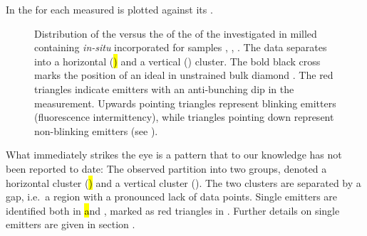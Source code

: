 	In  the \lw for each measured \ZPL is plotted against its \cwl.

	\begin{figure}[!htb]
			\centering
			\caption[Spectral distribution of \siv \ZPLs]{Distribution of the \ZPL \cwl versus the \lw of the \ZPL of the investigated \sivs in milled \nds containing \textit{in-situ} incorporated \sivs for samples \insituF, \insituS, \insituH{}. The data separates into a horizontal (\hl) and a vertical (\vl) cluster. The bold black cross marks the position of an ideal \siv in unstrained bulk diamond \cite{Arend2016a}. The red triangles indicate emitters with an anti-bunching dip in the \gtz measurement. Upwards pointing triangles represent blinking emitters (fluorescence intermittency), while triangles pointing down represent non-blinking emitters (see ).}
			\label{fig::bimodal_distr}
	\end{figure}

	What immediately strikes the eye is a pattern that to our knowledge has not been reported to date:
	The observed \ZPLs partition into two groups, denoted a horizontal cluster (\hl) and a vertical cluster (\vl). The two clusters are separated by a gap, i.e.\ a region with a pronounced lack of data points.
	Single emitters are identified both in \hl and \vl, marked as red triangles in . Further details on single emitters are given in section .
	
